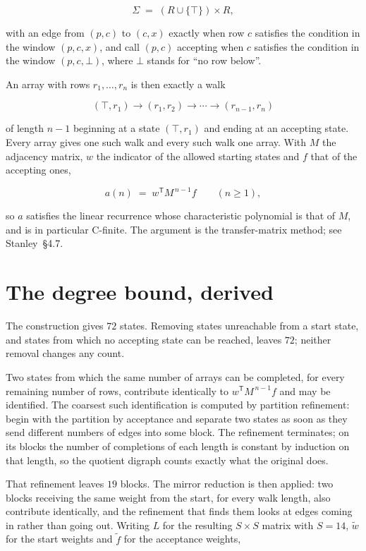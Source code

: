 \documentclass[11pt]{article}
\theoremstyle{definition}
\begin{document}
\[\Sigma \;=\; (R \cup \{\top\}) \times R,\]

with an edge from $(p,c)$ to $(c,x)$ exactly when row $c$ satisfies the condition in the window $(p,c,x)$, and call $(p,c)$ accepting when $c$ satisfies the condition in the window $(p,c,\bot)$, where $\bot$ stands for ``no row below''.

An array with rows $r_1,\dots,r_n$ is then exactly a walk

\[(\top,r_1) \to (r_1,r_2) \to \cdots \to (r_{n-1},r_n)\]

of length $n-1$ beginning at a state $(\top,r_1)$ and ending at an accepting state. Every array gives one such walk and every such walk one array. With $M$ the adjacency matrix, $w$ the indicator of the allowed starting states and $f$ that of the accepting ones,

\[a(n) \;=\; w^{\mathsf T} M^{\,n-1} f \qquad (n \ge 1),\]

so $a$ satisfies the linear recurrence whose characteristic polynomial is that of $M$, and is in particular C-finite. The argument is the transfer-matrix method; see Stanley~\S4.7.

\section{The degree bound, derived}

The construction gives $72$ states. Removing states unreachable from a start state, and states from which no accepting state can be reached, leaves $72$; neither removal changes any count.

Two states from which the same number of arrays can be completed, for every remaining number of rows, contribute identically to $w^{\mathsf T}M^{\,n-1}f$ and may be identified. The coarsest such identification is computed by partition refinement: begin with the partition by acceptance and separate two states as soon as they send different numbers of edges into some block. The refinement terminates; on its blocks the number of completions of each length is constant by induction on that length, so the quotient digraph counts exactly what the original does.

That refinement leaves $19$ blocks. The mirror reduction is then applied: two blocks receiving the same weight from the start, for every walk length, also contribute identically, and the refinement that finds them looks at edges coming in rather than going out. Writing $L$ for the resulting $S \times S$ matrix with $S = 14$, $\tilde w$ for the start weights and $\tilde f$ for the acceptance weights,
\end{document}
